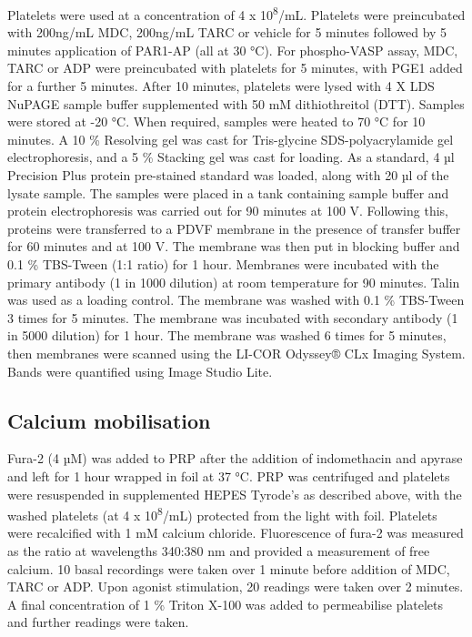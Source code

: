\documentclass[11pt,twoside]{bristolthesis}
\begin{document}
Platelets were used at a concentration of 4 x 10\textsuperscript{8}/mL. Platelets were preincubated with 200ng/mL MDC, 200ng/mL TARC or vehicle for 5 minutes followed by 5 minutes application of PAR1-AP (all at 30 °C). For phospho-VASP assay, MDC, TARC or ADP were preincubated with platelets for 5 minutes, with PGE1 added for a further 5 minutes. After 10 minutes, platelets were lysed with 4 X LDS NuPAGE sample buffer supplemented with 50 mM dithiothreitol (DTT). Samples were stored at -20 °C. When required, samples were heated to 70 °C for 10 minutes. A 10 \% Resolving gel was cast for Tris-glycine SDS-polyacrylamide gel electrophoresis, and a 5 \% Stacking gel was cast for loading. As a standard, 4 µl Precision Plus protein pre-stained standard was loaded, along with 20 µl of the lysate sample. The samples were placed in a tank containing sample buffer and protein electrophoresis was carried out for 90 minutes at 100 V. Following this, proteins were transferred to a PDVF membrane in the presence of transfer buffer for 60 minutes and at 100 V. The membrane was then put in blocking buffer and 0.1 \% TBS-Tween (1:1 ratio) for 1 hour. Membranes were incubated with the primary antibody (1 in 1000 dilution) at room temperature for 90 minutes. Talin was used as a loading control. The membrane was washed with 0.1 \% TBS-Tween 3 times for 5 minutes. The membrane was incubated with secondary antibody (1 in 5000 dilution) for 1 hour. The membrane was washed 6 times for 5 minutes, then membranes were scanned using the LI-COR Odyssey® CLx Imaging System. Bands were quantified using Image Studio Lite.

\hypertarget{calcium-mobilisation}{%
\subsection{Calcium mobilisation}\label{calcium-mobilisation}}

Fura-2 (4 µM) was added to PRP after the addition of indomethacin and apyrase and left for 1 hour wrapped in foil at 37 °C. PRP was centrifuged and platelets were resuspended in supplemented HEPES Tyrode's as described above, with the washed platelets (at 4 x 10\textsuperscript{8}/mL) protected from the light with foil. Platelets were recalcified with 1 mM calcium chloride. Fluorescence of fura-2 was measured as the ratio at wavelengths 340:380 nm and provided a measurement of free calcium. 10 basal recordings were taken over 1 minute before addition of MDC, TARC or ADP. Upon agonist stimulation, 20 readings were taken over 2 minutes. A final concentration of 1 \% Triton X-100 was added to permeabilise platelets and further readings were taken.
\end{document}
